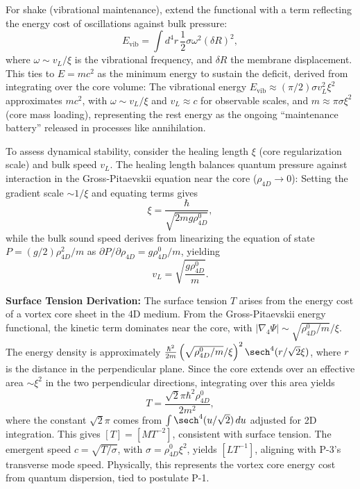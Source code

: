 For shake (vibrational maintenance), extend the functional with a term reflecting the energy cost of oscillations against bulk pressure:
\begin{equation}
E_{\text{vib}} = \int d^4 r \, \frac{1}{2} \sigma \omega^2 (\delta R)^2,
\end{equation}
where $\omega \sim v_L / \xi$ is the vibrational frequency, and $\delta R$ the membrane displacement. This ties to $E=mc^2$ as the minimum energy to sustain the deficit, derived from integrating over the core volume: The vibrational energy $E_{\text{vib}} \approx (\pi/2) \sigma v_L^2 \xi^2$ approximates $m c^2$, with $\omega \sim v_L / \xi$ and $v_L \approx c$ for observable scales, and $m \approx \pi \sigma \xi^2$ (core mass loading), representing the rest energy as the ongoing ``maintenance battery'' released in processes like annihilation.

To assess dynamical stability, consider the healing length $\xi$ (core regularization scale) and bulk speed $v_L$. The healing length balances quantum pressure against interaction in the Gross-Pitaevskii equation near the core ($\rho_{4D} \to 0$): Setting the gradient scale $\sim 1/\xi$ and equating terms gives
\begin{equation}
\xi = \frac{\hbar}{\sqrt{2 m g \rho_{4D}^0}},
\end{equation}
while the bulk sound speed derives from linearizing the equation of state $P = (g/2) \rho_{4D}^2 / m$ as $\partial P / \partial \rho_{4D} = g \rho_{4D}^0 / m$, yielding
\begin{equation}
v_L = \sqrt{\frac{g \rho_{4D}^0}{m}}.
\end{equation}

\textbf{Surface Tension Derivation:} The surface tension $T$ arises from the energy cost of a vortex core sheet in the 4D medium. From the Gross-Pitaevskii energy functional, the kinetic term dominates near the core, with $|\nabla_4 \Psi| \sim \sqrt{\rho_{4D}^0 / m} / \xi$. The energy density is approximately $\frac{\hbar^2}{2m} \left( \sqrt{\rho_{4D}^0 / m} / \xi \right)^2 \sech^4(r / \sqrt{2} \xi)$, where $r$ is the distance in the perpendicular plane. Since the core extends over an effective area $\sim \xi^2$ in the two perpendicular directions, integrating over this area yields
\begin{equation}
T = \frac{\sqrt{2} \pi \hbar^2 \rho_{4D}^0}{2 m^2},
\end{equation}
where the constant $\sqrt{2} \pi$ comes from $\int \sech^4(u / \sqrt{2}) \, du$ adjusted for 2D integration. This gives $[T] = [M T^{-2}]$, consistent with surface tension. The emergent speed $c = \sqrt{T / \sigma}$, with $\sigma = \rho_{4D}^0 \xi^2$, yields $[L T^{-1}]$, aligning with P-3's transverse mode speed. Physically, this represents the vortex core energy cost from quantum dispersion, tied to postulate P-1.

